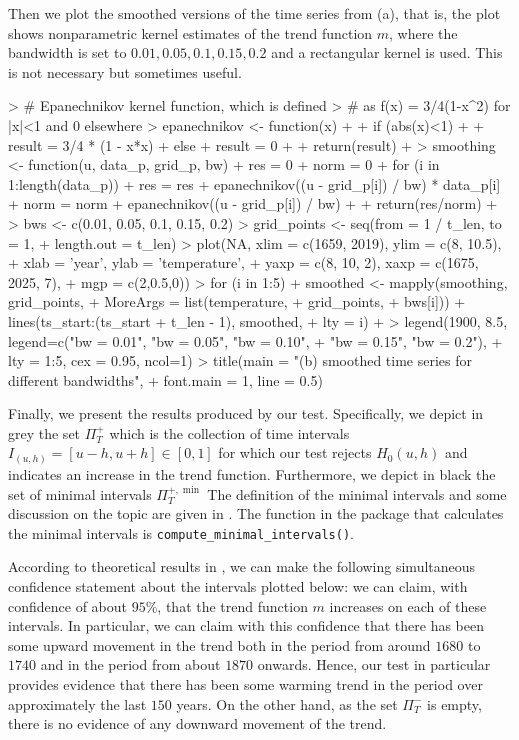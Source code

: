 \documentclass[a4paper]{scrartcl}
\begin{document}
Then we plot the smoothed versions of the time series from (a), that is, the plot shows nonparametric kernel estimates of the trend function $m$, where the bandwidth is set to $0.01, 0.05, 0.1, 0.15, 0.2$ and a rectangular kernel is used. This is not necessary but sometimes useful.
\begin{Schunk}
\begin{Sinput}
> # Epanechnikov kernel function, which is defined
> # as f(x) = 3/4(1-x^2) for |x|<1 and 0 elsewhere
> epanechnikov <- function(x)
+ {
+   if (abs(x)<1)
+   {
+     result = 3/4 * (1 - x*x)
+   } else {
+     result = 0
+   }
+   return(result)
+ }
> smoothing <- function(u, data_p, grid_p, bw){
+   res = 0
+   norm = 0
+   for (i in 1:length(data_p)){
+     res = res + epanechnikov((u - grid_p[i]) / bw) * data_p[i]
+     norm = norm + epanechnikov((u - grid_p[i]) / bw)
+   }
+   return(res/norm)
+ }
> bws <- c(0.01, 0.05, 0.1, 0.15, 0.2)
> grid_points <- seq(from = 1 / t_len, to = 1,
+                    length.out = t_len)
> plot(NA, xlim = c(1659, 2019), ylim = c(8, 10.5),
+      xlab = 'year', ylab = 'temperature',
+      yaxp  = c(8, 10, 2), xaxp = c(1675, 2025, 7),
+      mgp = c(2,0.5,0))
> for (i in 1:5){
+     smoothed <- mapply(smoothing, grid_points,
+                        MoreArgs = list(temperature,
+                                        grid_points,
+                                        bws[i]))
+     lines(ts_start:(ts_start + t_len - 1), smoothed,
+           lty = i)
+   }
> legend(1900, 8.5, legend=c("bw = 0.01", "bw = 0.05", "bw = 0.10",
+                            "bw = 0.15", "bw = 0.2"),
+        lty = 1:5, cex = 0.95, ncol=1)
> title(main = "(b) smoothed time series for different bandwidths",
+       font.main = 1, line = 0.5)
\end{Sinput}
\end{Schunk}

Finally, we present the results produced by our test. Specifically, we depict in grey the set $\Pi^{+}_T$ which is the collection of time intervals $I_{(u,h)} = [u - h, u + h] \in [0, 1]$ for which our test rejects $H_0(u,h)$ and indicates an increase in the trend function. Furthermore, we depict in black the set of minimal intervals $\Pi^{+, \min}_T$ The definition of the minimal intervals and some discussion on the topic are given in \cite{KhismatullinaVogt2020}. The function in the package that calculates the minimal intervals is \verb|compute_minimal_intervals()|.


According to theoretical results in \cite{KhismatullinaVogt2020}, we can make the following simultaneous confidence statement about the intervals plotted below: we can claim, with confidence of about $95\%$, that the trend function $m$ increases on each of these intervals. In particular, we can claim with this confidence that there has been some upward movement in the trend both in the period from around $1680$ to $1740$ and in the period from about $1870$ onwards. Hence, our test in particular provides evidence that there has been some warming trend in the period over approximately the last $150$ years. On the other hand, as the set $\Pi_T^-$ is empty, there is no evidence of any downward movement of the trend.
\end{document}
